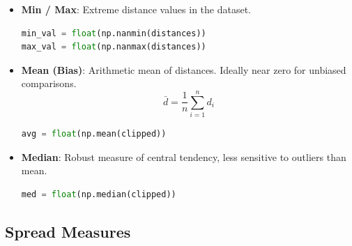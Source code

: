 \documentclass[12pt]{article}
\begin{document}
\begin{itemize}
    \item \textbf{Min / Max}: Extreme distance values in the dataset.
    \begin{lstlisting}[language=Python]
min_val = float(np.nanmin(distances))
max_val = float(np.nanmax(distances))
    \end{lstlisting}

    \item \textbf{Mean (Bias)}: Arithmetic mean of distances. Ideally near zero for unbiased comparisons.
    \begin{equation}
        \bar{d} = \frac{1}{n} \sum_{i=1}^{n} d_i
    \end{equation}
    \begin{lstlisting}[language=Python]
avg = float(np.mean(clipped))
    \end{lstlisting}

    \item \textbf{Median}: Robust measure of central tendency, less sensitive to outliers than mean.
    \begin{lstlisting}[language=Python]
med = float(np.median(clipped))
    \end{lstlisting}
\end{itemize}

\subsection{Spread Measures}
\end{document}
